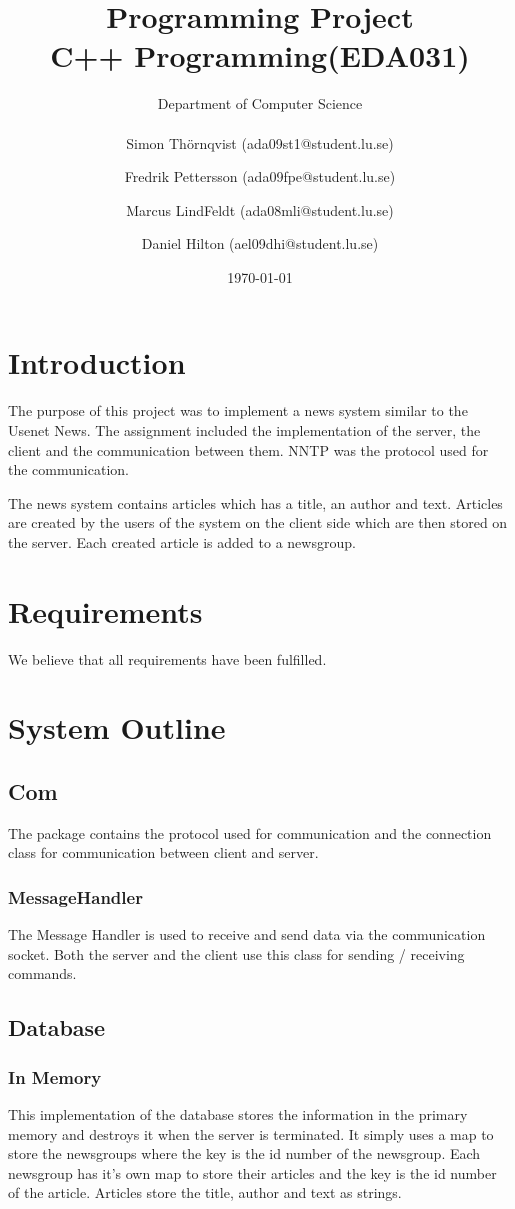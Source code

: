 \documentclass[a4paper, titlepage]{article}
\title{
    Programming Project \\
    C++ Programming(EDA031)
}
\author{
        Department of Computer Science \\
            \\
        Simon Thörnqvist (ada09st1@student.lu.se)
            \and
        Fredrik Pettersson (ada09fpe@student.lu.se)
            \and
        Marcus LindFeldt (ada08mli@student.lu.se)
            \and
        Daniel Hilton (ael09dhi@student.lu.se)
}
\date{\today}
\begin{document}
\maketitle

\section{Introduction}\label{introduction}
The purpose of this project was to implement a news system similar to the Usenet News. The assignment included the implementation of the server, the client and the communication between them. NNTP was the protocol used for the communication.

The news system contains articles which has a title, an author and text. Articles are created by the users of the system on the client side which are then stored on the server. Each created article is added to a newsgroup.

\section{Requirements}\label{requirements}
We believe that all requirements have been fulfilled.

\section{System Outline}\label{systemoutline}

\subsection{Com}
The package contains the protocol used for communication and the connection class for communication between client and server.

\subsubsection{MessageHandler}
The Message Handler is used to receive and send data via the communication socket. Both the server and the client use this class for sending / receiving commands.

\subsection{Database}

\subsubsection{In Memory}
This implementation of the database stores the information in the primary memory and destroys it when the server is terminated. It simply uses a map to store the newsgroups where the key is the id number of the newsgroup. Each newsgroup has it's own map to store their articles and the key is the id number of the article. Articles store the title, author and text as strings.
\end{document}
